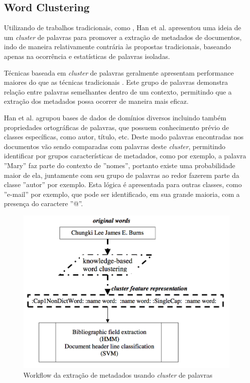 \subsection{Word Clustering}

Utilizando de trabalhos tradicionais, como \cite{svm}, Han et al. \cite{rule-based} apresentou uma ideia de um \textit{cluster} de palavras para promover a extração de metadados de documentos, indo de maneira relativamente contrária às propostas tradicionais, baseando apenas na ocorrência e estatísticas de palavras isoladas.

Técnicas baseada em \textit{cluster} de palavras geralmente apresentam performance maiores do que as técnicas tradicionais \cite{rule-based}. Este grupo de palavras demonstra relação entre palavras semelhantes dentro de um contexto, permitindo que a extração dos metadados possa ocorrer de maneira mais eficaz.

Han et al. agrupou bases de dados de domínios diversos incluindo também propriedades ortográficas de palavras, que possuem conhecimento prévio de classes específicas, como autor, título, etc. Deste modo palavras encontradas nos documentos vão sendo comparadas com palavras deste \textit{cluster}, permitindo identificar por grupos características de metadados, como por exemplo, a palavra ''Mary'' faz parte do contexto de ''nomes'', portanto existe uma probabilidade maior de ela, juntamente com seu grupo de palavras ao redor fazerem parte da classe ''autor'' por exemplo. Esta lógica é apresentada para outras classes, como ''e-mail'' por exemplo, que pode ser identificado, em sua grande maioria, com a presença do caractere ''@''.

\begin{figure}
\centering
\caption{Workflow da extração de metadados usando \textit{cluster} de palavras}
\label{fig:workflow-rule-based}
\includegraphics[width=0.7\linewidth]{./assets/workflow-rule-based}
\end{figure}

